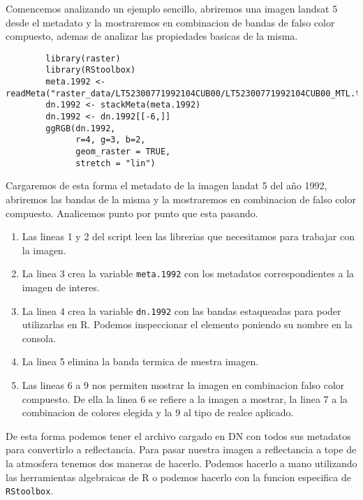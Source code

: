\begin{exa}
   Comencemos analizando un ejemplo sencillo, abriremos una imagen landsat 5
    desde el metadato y la mostraremos en combinacion de bandas de falso color
    compuesto, ademas de analizar las propiedades basicas de la misma.
    \begin{lstlisting}
        library(raster)
        library(RStoolbox)
        meta.1992 <- readMeta("raster_data/LT52300771992104CUB00/LT52300771992104CUB00_MTL.txt")
        dn.1992 <- stackMeta(meta.1992)
        dn.1992 <- dn.1992[[-6,]]
        ggRGB(dn.1992, 
              r=4, g=3, b=2, 
              geom_raster = TRUE, 
              stretch = "lin")
    \end{lstlisting}
    
    Cargaremos de esta forma el metadato de la imagen landat 5 del año 1992,
    abriremos las bandas de la misma y la mostraremos en combinacion de falso
    color compuesto. Analicemos punto por punto que esta pasando.
    \begin{enumerate}
        \item Las lineas 1 y 2 del script leen las librerias que necesitamos
            para trabajar con la imagen.
        \item La linea 3 crea la variable \texttt{meta.1992} con los metadatos
            correspondientes a la imagen de interes.
        \item La linea 4 crea la variable \texttt{dn.1992} con las bandas
            estaqueadas para poder utilizarlas en R. Podemos inspeccionar el
            elemento poniendo su nombre en la consola.
        \item La linea 5 elimina la banda termica de nuestra imagen.
        \item Las lineas 6 a 9 nos permiten mostrar la imagen en combinacion
            falso color compuesto. De ella la linea 6 se refiere a la imagen a
            mostrar, la linea 7 a la combinacion de colores elegida y la 9 al
            tipo de realce aplicado.
    \end{enumerate}
\end{exa}

De esta forma podemos tener el archivo cargado en DN con todos sus metadatos
para convertirlo a reflectancia. Para pasar nuestra imagen a reflectancia a tope
de la atmosfera tenemos dos maneras de hacerlo. Podemos hacerlo a mano
utilizando las herramientas algebraicas de R o podemos hacerlo con la funcion
especifica de \texttt{RStoolbox}.

